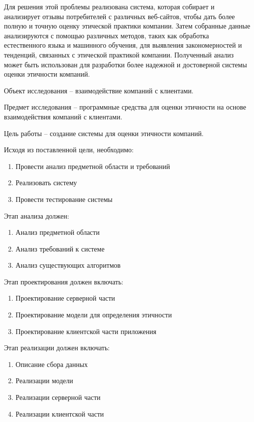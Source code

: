 \documentclass[PI, VKR]{HSEUniversity}
\begin{document}
Для решения этой проблемы реализована система, которая собирает и анализирует отзывы потребителей с различных веб-сайтов, чтобы дать более полную и точную оценку этической практики компании. Затем собранные данные анализируются с помощью различных методов, таких как обработка естественного языка и машинного обучения, для выявления закономерностей и тенденций, связанных с этической практикой компании. Полученный анализ может быть использован для разработки более надежной и достоверной системы оценки этичности компаний.

Объект исследования – взаимодействие компаний с клиентами.

Предмет исследования – программные средства для оценки этичности на основе взаимодействия компаний с клиентами.

Цель работы – создание системы для оценки этичности компаний.

Исходя из поставленной цели, необходимо:

\begin{enumerate}
\item Провести анализ предметной области и требований
\item Реализовать систему
\item Провести тестирование системы
\end{enumerate}

Этап анализа должен:
\begin{enumerate}
\item Анализ предметной области
\item Анализ требований к системе
\item Анализ существующих алгоритмов
\end{enumerate}

Этап проектирования должен включать:
\begin{enumerate}
\item Проектирование серверной части
\item Проектирование модели для определения этичности
\item Проектирование клиентской части приложения
\end{enumerate}

Этап реализации должен включать:
\begin{enumerate}
\item Описание сбора данных
\item Реализации модели
\item Реализации серверной части
\item Реализации клиентской части
\end{enumerate}
\end{document}

